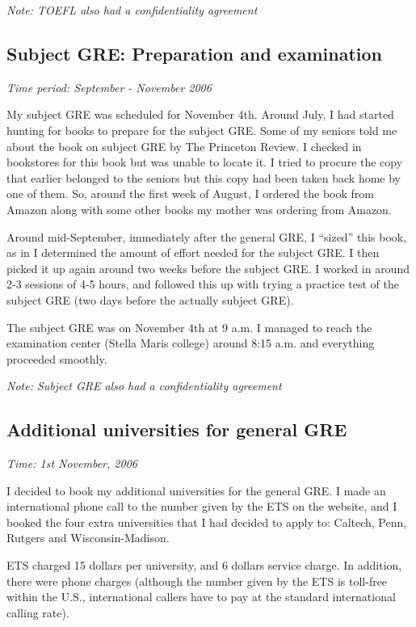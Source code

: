 \documentclass[a4paper]{amsart}
\begin{document}
{\em Note: TOEFL also had a confidentiality agreement}

\subsection{Subject GRE: Preparation and examination}

{\em Time period: September - November 2006}

My subject GRE was scheduled for November 4th. Around July, I had
started hunting for books to prepare for the subject GRE. Some of my seniors
told me about the book on subject GRE by The Princeton Review. I checked
in bookstores for this book but was unable to locate it. I tried
to procure the copy that earlier belonged to the seniors but this
copy had been taken back home by one of them. So, around the first week
of August, I ordered the book from Amazon along with some other books
my mother was ordering from Amazon.

Around mid-September, immediately after the general GRE, I ``sized''
this book, as in I determined the amount of effort needed for the
subject GRE. I then picked it up again around two weeks before the
subject GRE. I worked in around 2-3 sessions of 4-5 hours,
and followed this up with trying a practice test of the subject GRE
(two days before the actually subject GRE).

The subject GRE was on November 4th at 9 a.m. I managed to reach the
examination center (Stella Maris college) around 8:15 a.m. and everything
proceeded smoothly.

{\em Note: Subject GRE also had a confidentiality agreement}

\subsection{Additional universities for general GRE}

{\em Time: 1st November, 2006}

I decided to book my additional universities for the general GRE. I
made an international phone call to the number given by the ETS on the
website, and I booked the four extra universities that I had decided
to apply to: Caltech, Penn, Rutgers and Wisconsin-Madison.

ETS charged 15 dollars per university, and 6 dollars service charge.
In addition, there were phone charges (although the number
given by the ETS is toll-free within the U.S., international callers
have to pay at the standard international calling rate).
\end{document}
